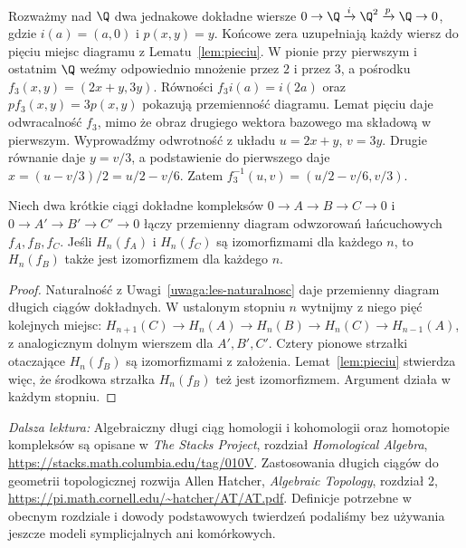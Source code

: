 \begin{przyklad}
Rozważmy nad $\Q$ dwa jednakowe dokładne wiersze
$0\to\Q\xrightarrow{i}\Q^2\xrightarrow{p}\Q\to0$,
gdzie $i(a)=(a,0)$ i $p(x,y)=y$.
Końcowe zera uzupełniają każdy wiersz do pięciu miejsc
diagramu z Lematu~\ref{lem:pieciu}.
W pionie przy pierwszym i ostatnim $\Q$ weźmy
odpowiednio mnożenie przez $2$ i przez $3$,
a pośrodku $f_3(x,y)=(2x+y,3y)$.
Równości $f_3i(a)=i(2a)$ oraz $pf_3(x,y)=3p(x,y)$
pokazują przemienność diagramu. Lemat pięciu daje
odwracalność $f_3$, mimo że obraz drugiego wektora
bazowego ma składową w pierwszym. Wyprowadźmy odwrotność
z układu $u=2x+y$, $v=3y$.
Drugie równanie daje $y=v/3$, a podstawienie do pierwszego
daje $x=(u-v/3)/2=u/2-v/6$.
Zatem $f_3^{-1}(u,v)=(u/2-v/6,v/3)$.
\end{przyklad}

\begin{wniosek}
\label{wn:pieciu-ses-kompleksy}
Niech dwa krótkie ciągi dokładne kompleksów
$0\to A\to B\to C\to0$ i
$0\to A'\to B'\to C'\to0$ łączy przemienny diagram
odwzorowań łańcuchowych $f_A,f_B,f_C$.
Jeśli $H_n(f_A)$ i $H_n(f_C)$ są izomorfizmami
dla każdego $n$, to $H_n(f_B)$ także jest
izomorfizmem dla każdego $n$.
\end{wniosek}
\begin{proof}
Naturalność z Uwagi~\ref{uwaga:les-naturalnosc} daje
przemienny diagram długich ciągów dokładnych.
W ustalonym stopniu $n$ wytnijmy z niego pięć
kolejnych miejsc: $H_{n+1}(C)\to H_n(A)\to H_n(B)
\to H_n(C)\to H_{n-1}(A)$, z analogicznym
dolnym wierszem dla $A',B',C'$.
Cztery pionowe strzałki otaczające $H_n(f_B)$
są izomorfizmami z założenia. Lemat~\ref{lem:pieciu}
stwierdza więc, że środkowa strzałka $H_n(f_B)$
też jest izomorfizmem. Argument działa w każdym stopniu.
\end{proof}

\par\smallskip
{\footnotesize\noindent\emph{Dalsza lektura:}
Algebraiczny długi ciąg homologii i kohomologii
oraz homotopie kompleksów są opisane w
\emph{The Stacks Project}, rozdział
\emph{Homological Algebra},
\url{https://stacks.math.columbia.edu/tag/010V}.
Zastosowania długich ciągów do geometrii
topologicznej rozwija Allen Hatcher,
\emph{Algebraic Topology}, rozdział 2,
\url{https://pi.math.cornell.edu/~hatcher/AT/AT.pdf}.
Definicje potrzebne w obecnym rozdziale
i dowody podstawowych twierdzeń podaliśmy
bez używania jeszcze modeli
symplicjalnych ani komórkowych.\par}
\clearpage

